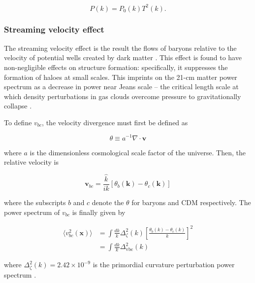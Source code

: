 \documentclass[floats,floatfix,showpacs,amssymb,prd,superscriptaddress,nofootinbib]{revtex4-2} %
\newcommand{\red}{\textcolor{red}}
\begin{document}
\begin{equation}
    P(k) = P_0 (k) T^2 (k).
    \label{eq:processed_power_spectrum}
\end{equation}

\subsubsection{Streaming velocity effect}
The streaming velocity effect is the result the flows of baryons relative to the velocity of potential wells created by dark matter \citep{Tseliakhovich_Hirata_2010}. This effect is found to have non-negligible effects on structure formation: specifically, it suppresses the formation of haloes at small scales. This imprints on the 21-cm matter power spectrum as a decrease in power near Jeans scale \citep{Tseliakhovich_Hirata_2010} -- the critical length scale at which density perturbations in gas clouds overcome pressure to gravitationally collapse \citep{Jeans_1902}.

To define $v_{bc}$, the velocity divergence must first be defined as 

\begin{equation}
    \theta \equiv a^{-1} \nabla \cdot \textbf{v}
    \label{eq:velocity_divergence}
\end{equation}

\noindent where $a$ is the dimensionless cosmological scale factor of the universe. 
Then, the relative velocity is

\begin{equation}
    \textbf{v}_{bc} = \frac{\hat{k}}{ik} \left[ \theta_b (\textbf{k}) - \theta_c (\textbf{k}) \right]
    \label{eq:vbc_definition}
\end{equation}

\noindent where the subscripts $b$ and $c$ denote the $\theta$ for baryons and CDM respectively. The power spectrum of $v_{bc}$ is finally given by 

\begin{equation}
\begin{split}
        \langle v_{bc}^2 (\textbf{x}) \rangle 
        & = \int \frac{dk}{k} \Delta_\zeta^2 (k) \left[ \frac{\theta_b (k) - \theta_c (k)}{k} \right]^2 \\
        & = \int \frac{dk}{k} \Delta_{\text{vbc}}^2 (k)
\end{split}
\end{equation}

\noindent where $\Delta_\zeta ^2 (k) = 2.42 \times 10^{-9}$ is the primordial curvature perturbation power spectrum \citep{Dunkley_2009}.
\end{document}
